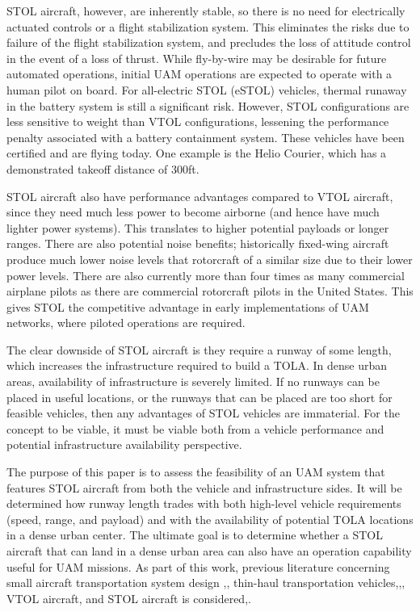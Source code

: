 \documentclass[]{aiaa-tc}%
\begin{document}
STOL aircraft, however, are inherently stable, so there is no need for electrically actuated controls or a flight stabilization system.  This eliminates the risks due to failure of the flight stabilization system, and precludes the loss of attitude control in the event of a loss of thrust.  While fly-by-wire may be desirable for future automated operations, initial UAM operations are expected to operate with a human pilot on board\cite{Uber}. For all-electric STOL (eSTOL) vehicles, thermal runaway in the battery system is still a significant risk.  However, STOL configurations are less sensitive to weight than VTOL configurations, lessening the performance penalty associated with a battery containment system.  These vehicles have been certified and are flying today. One example is the Helio Courier, which has a demonstrated takeoff distance of 300ft\cite{Rucker}.

STOL aircraft also have performance advantages compared to VTOL aircraft, since they need much less power to become airborne (and hence have much lighter power systems).  This translates to higher potential payloads or longer ranges. There are also potential noise benefits;  historically fixed-wing aircraft produce much lower noise levels that rotorcraft of a similar size due to their lower power levels.  There are also currently more than four times as many commercial airplane pilots as there are commercial rotorcraft pilots in the United States\cite{Airmen}. This gives STOL the competitive advantage in early implementations of UAM networks, where piloted operations are required.  

The clear downside of STOL aircraft is they require a runway of some length, which increases the infrastructure required to build a TOLA.  In dense urban areas, availability of infrastructure is severely limited.  If no runways can be placed in useful locations, or the runways that can be placed are too short for feasible vehicles, then any advantages of STOL vehicles are immaterial.  For the concept to be viable, it must be viable both from a vehicle performance and potential infrastructure availability perspective. 

The purpose of this paper is to assess the feasibility of an UAM system that features STOL aircraft from both the vehicle and infrastructure sides.  It will be determined how runway length trades with both high-level vehicle requirements (speed, range, and payload) and with the availability of potential TOLA locations in a dense urban center.  The ultimate goal is to determine whether a STOL aircraft that can land in a dense urban area can also have an operation capability useful for UAM missions. As part of this work, previous literature concerning small aircraft transportation system design \cite{Viken},\cite{Holmes}, thin-haul transportation vehicles\cite{Harish},\cite{Kreimeier},\cite{Justin}, VTOL aircraft\cite{Duffy}, and STOL aircraft is considered\cite{Antcliff},\cite{SeeleyIV}. 
 
\end{document}
